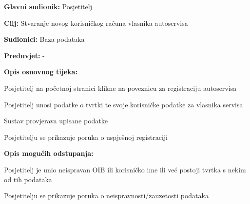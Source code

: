 \noindent {}
\begin{packed_item}
	
	\item \textbf{Glavni sudionik: } Posjetitelj
	\item  \textbf{Cilj:} Stvaranje novog korisničkog računa vlasnika
	autoservisa
	\item  \textbf{Sudionici:} Baza podataka
	\item  \textbf{Preduvjet:} -
	\item  \textbf{Opis osnovnog tijeka:}
	
	\item[] \begin{packed_enum}
		
		\item Posjetitelj na početnoj stranici klikne na poveznicu za
		registraciju autoservisa
		\item Posjetitelj unosi podatke o tvrtki te svoje korisničke podatke za
		vlasnika servisa
		\item Sustav provjerava upisane podatke
		\item Posjetitelju se prikazuje poruka o uspješnoj registraciji
	\end{packed_enum}
	
	\item  \textbf{Opis mogućih odstupanja:}
	
	\item[] \begin{packed_item}
		
		\item[3.a] Posjetitelj je unio neispravan OIB ili korisničko ime ili već
		postoji tvrtka s nekim od tih podataka
		\item[] \begin{packed_enum}
			
			\item Posjetitelju se prikazuje poruka o neispravnosti/zauzetosti
			podataka
			
		\end{packed_enum}
		
	\end{packed_item}
\end{packed_item}

